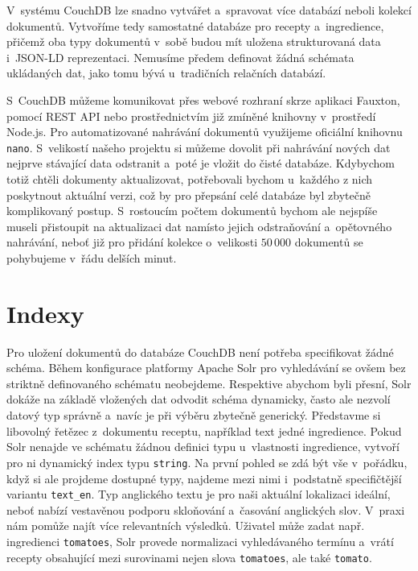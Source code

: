 V~systému CouchDB lze snadno vytvářet a~spravovat více databází neboli kolekcí dokumentů. Vytvoříme tedy samostatné databáze pro recepty a~ingredience, přičemž oba typy dokumentů v~sobě budou mít uložena strukturovaná data i~JSON-LD reprezentaci. Nemusíme předem definovat žádná schémata ukládaných dat, jako tomu bývá u~tradičních relačních databází.

S~CouchDB můžeme komunikovat přes webové rozhraní skrze aplikaci Fauxton, pomocí REST API nebo prostřednictvím již zmíněné knihovny v~prostředí Node.js. Pro automatizované nahrávání dokumentů využijeme oficiální knihovnu \texttt{nano}. S~velikostí našeho projektu si můžeme dovolit při nahrávání nových dat nejprve stávající data odstranit a~poté je vložit do čisté databáze. Kdybychom totiž chtěli dokumenty aktualizovat, potřebovali bychom u~každého z nich poskytnout aktuální verzi, což by pro přepsání celé databáze byl zbytečně komplikovaný postup. S~rostoucím počtem dokumentů bychom ale nejspíše museli přistoupit na aktualizaci dat namísto jejich odstraňování a~opětovného nahrávání, neboť již pro přidání kolekce o~velikosti $50\,000$ dokumentů se pohybujeme v~řádu delších minut.

\section{Indexy}

Pro uložení dokumentů do databáze CouchDB není potřeba specifikovat žádné schéma. Během konfigurace platformy Apache Solr pro vyhledávání se ovšem bez striktně definovaného schématu neobejdeme. Respektive abychom byli přesní, Solr dokáže na základě vložených dat odvodit schéma dynamicky, často ale nezvolí datový typ správně a~navíc je při výběru zbytečně generický. Představme si libovolný řetězec z~dokumentu receptu, například text jedné ingredience. Pokud Solr nenajde ve schématu žádnou definici typu u~vlastnosti ingredience, vytvoří pro ni dynamický index typu \texttt{string}. Na první pohled se zdá být vše v~pořádku, když si ale projdeme dostupné typy, najdeme mezi nimi i~podstatně specifičtější variantu \texttt{text\_en}. Typ anglického textu je pro naši aktuální lokalizaci ideální, neboť nabízí vestavěnou podporu skloňování a~časování anglických slov. V~praxi nám pomůže najít více relevantních výsledků. Uživatel může zadat např. ingredienci \texttt{tomatoes}, Solr provede normalizaci vyhledávaného termínu a~vrátí recepty obsahující mezi surovinami nejen slova \texttt{tomatoes}, ale také \texttt{tomato}.

